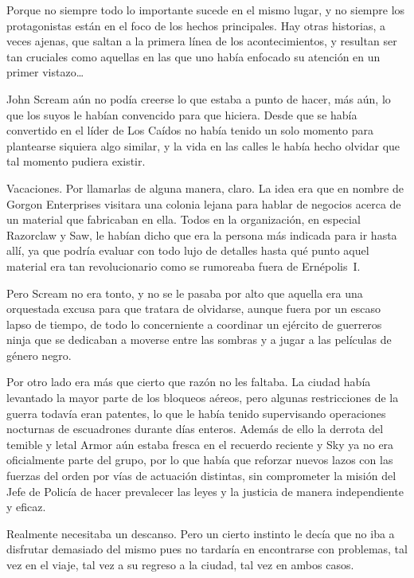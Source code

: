 Porque no siempre todo lo importante sucede en el mismo lugar, y no siempre los protagonistas están en el foco de los hechos principales. Hay otras historias, a veces ajenas, que saltan a la primera línea de los acontecimientos, y resultan ser tan cruciales como aquellas en las que uno había enfocado su atención en un primer vistazo\dots

\fancyparbreak
John Scream aún no podía creerse lo que estaba a punto de hacer, más aún, lo que los suyos le habían convencido para que hiciera. Desde que se había convertido en el líder de Los Caídos no había tenido un solo momento para plantearse siquiera algo similar, y la vida en las calles le había hecho olvidar que tal momento pudiera existir.

Vacaciones. Por llamarlas de alguna manera, claro. La idea era que en nombre de Gorgon Enterprises visitara una colonia lejana para hablar de negocios acerca de un material que fabricaban en ella. Todos en la organización, en especial Razorclaw y Saw, le habían dicho que era la persona más indicada para ir hasta allí, ya que podría evaluar con todo lujo de detalles hasta qué punto aquel material era tan revolucionario como se rumoreaba fuera de Ernépolis~I.

Pero Scream no era tonto, y no se le pasaba por alto que aquella era una orquestada excusa para que tratara de olvidarse, aunque fuera por un escaso lapso de tiempo, de todo lo concerniente a coordinar un ejército de guerreros ninja que se dedicaban a moverse entre las sombras y a jugar a las películas de género negro.

Por otro lado era más que cierto que razón no les faltaba. La ciudad había levantado la mayor parte de los bloqueos aéreos, pero algunas restricciones de la guerra todavía eran patentes, lo que le había tenido supervisando operaciones nocturnas de escuadrones durante días enteros. Además de ello la derrota del temible y letal Armor aún estaba fresca en el recuerdo reciente y Sky ya no era oficialmente parte del grupo, por lo que había que reforzar nuevos lazos con las fuerzas del orden por vías de actuación distintas, sin comprometer la misión del Jefe de Policía de hacer prevalecer las leyes y la justicia de manera independiente y eficaz.

Realmente necesitaba un descanso. Pero un cierto instinto le decía que no iba a disfrutar demasiado del mismo pues no tardaría en encontrarse con problemas, tal vez en el viaje, tal vez a su regreso a la ciudad, tal vez en ambos casos.

